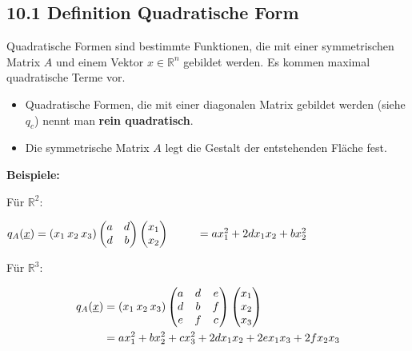 \subsection{10.1 Definition Quadratische Form}{
\vskip2pt
Quadratische Formen sind bestimmte Funktionen, die mit einer symmetrischen Matrix $A$ und einem Vektor $x \in \mathbb{R}^n$ gebildet werden. Es kommen maximal quadratische Terme vor.

\begin{center}
\end{center}

\begin{itemize}[leftmargin=0.29cm, itemsep=0pt]
\item Quadratische Formen, die mit einer diagonalen Matrix gebildet werden (siehe $q_c$) nennt man \textbf{rein quadratisch}.
\item Die symmetrische Matrix $A$ legt die Gestalt der entstehenden Fläche fest.
\end{itemize}


\vspace{2pt}

\textbf{Beispiele:} \par
Für $\mathbb{R}^2$:

$q_A(\underline{x}) = (x_1 \hskip2pt x_2 \hskip2pt x_3)  \begin{pmatrix} a & d\\ d & b\end{pmatrix}  \begin{pmatrix} x_1 \\ x_2\end{pmatrix}\\
\hphantom{q_A(\underline{x})} = ax_1^2 + 2dx_1x_2 + bx_2^2$\vskip2pt

Für $\mathbb{R}^3$:
\vspace{-11pt}

\begin{align}
q_A(\underline{x}) &= (x_1 \hskip2pt x_2 \hskip2pt x_3)  \begin{pmatrix} a & d & e \\ d & b & f \\ e & f & c \end{pmatrix}  \begin{pmatrix} x_1 \\ x_2 \\ x_3 \end{pmatrix} \nonumber\\ 
&= ax_1^2 + bx_2^2 + cx_3^2 + 2dx_1x_2 + 2ex_1x_3 + 2fx_2x_3 \nonumber
\end{align}

}
\WhiteSpace
